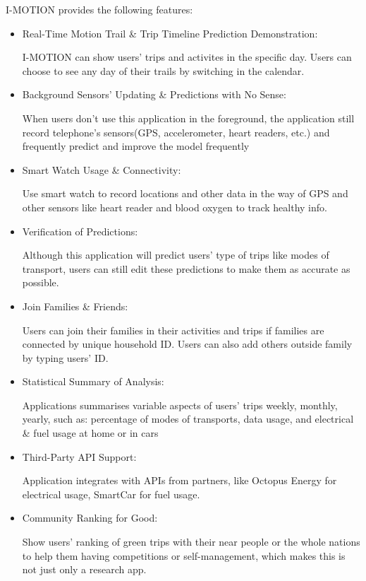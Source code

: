 \documentclass[12pt,two side]{report}
\begin{document}
I-MOTION provides the following features:
\begin{itemize}
  \item Real-Time Motion Trail \& Trip Timeline Prediction Demonstration: 
  
  I-MOTION can show users' trips and activites in the specific day. Users can choose to see any day of their trails by switching in the calendar.
  
  \item Background Sensors' Updating \& Predictions with No Sense:

  When users don't use this application in the foreground, the application still record telephone's sensors(GPS, accelerometer, heart readers, etc.) and frequently predict and improve the model frequently
  
  \item Smart Watch Usage \& Connectivity:

  Use smart watch to record locations and other data in the way of GPS and other sensors like heart reader and blood oxygen to track healthy info.
  
  \item Verification of Predictions:

  Although this application will predict users' type of trips like modes of transport, users can still edit these predictions to make them as accurate as possible.
  
  \item Join Families \& Friends:

  Users can join their families in their activities and trips if families are connected by unique household ID. Users can also add others outside family by typing users' ID.

  \item Statistical Summary of Analysis:
  
  Applications summarises variable aspects of users' trips weekly, monthly, yearly, such as: percentage of modes of transports, data usage, and electrical \& fuel usage at home or in cars

  \item Third-Party API Support:

  Application integrates with APIs from partners, like Octopus Energy for electrical usage, SmartCar for fuel usage.

  \item Community Ranking for Good:

    Show users' ranking of green trips with their near people or the whole nations to help them having competitions or self-management, which makes this is not just only a research app.
\end{itemize}
\end{document}
